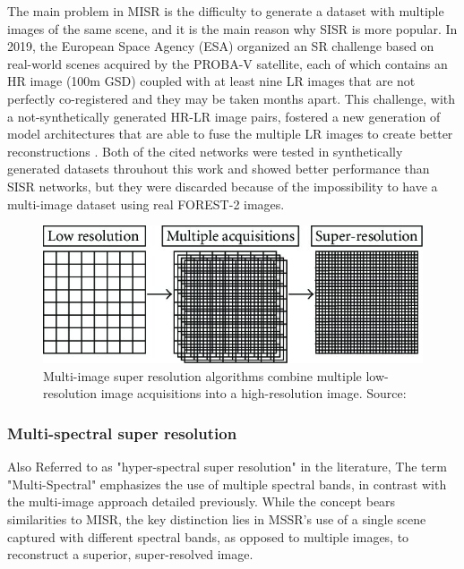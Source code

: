         The main problem in MISR is the difficulty to generate a dataset with multiple images of the same scene, and it is the main reason why SISR is more popular.
        In 2019, the European Space Agency (ESA) organized an SR challenge  \cite{martens2019superresolution} based on real-world scenes acquired by the PROBA-V satellite, each of which contains an HR image (100m GSD) coupled with at least nine LR images that are not perfectly co-registered and they may be taken months apart. 
        This challenge, with a not-synthetically generated HR-LR image pairs, fostered a new generation of model architectures that are able to fuse the multiple LR images to create better reconstructions \cite{Salvetti_2020,Bordone_Molini_2020}.
         Both of the cited networks were tested in synthetically generated datasets throuhout this work and showed better performance than SISR networks, but they were discarded because of the impossibility to have a multi-image dataset using real FOREST-2 images.

        \begin{figure}[H]
            \centering
            \includegraphics[width=\textwidth]{Includes/2-MISR.jpeg}
            \caption{Multi-image super resolution algorithms combine multiple low-resolution image acquisitions into a high-resolution image. Source: \cite{MISR2007}}
            \label{fig:2-MISR}
        \end{figure}
        
        \subsubsection{Multi-spectral super resolution}

        Also Referred to as "hyper-spectral super resolution" in the literature, The term "Multi-Spectral" emphasizes the use of multiple spectral bands, in contrast with the multi-image approach detailed previously. While the concept bears similarities to MISR, the key distinction lies in MSSR's use of a single scene captured with different spectral bands, as opposed to multiple images, to reconstruct a superior, super-resolved image.

